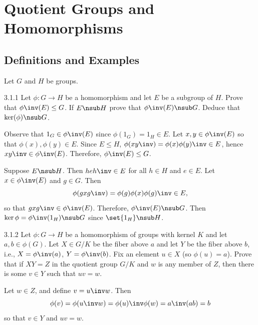 \section{Quotient Groups and Homomorphisms}

\subsection{Definitions and Examples}

Let $G$ and $H$ be groups.

\begin{exercise}{3.1.1}
    Let $\phi : G \to H$ be a homomorphism and let $E$ be a subgroup of $H$.
	Prove that $\phi\inv(E) \leq G$.
	If $E \nsub H$ prove that $\phi\inv(E) \nsub G$.
	Deduce that $\ker(\phi) \nsub G$.
\end{exercise}

\begin{sol}
    Observe that $1_G \in \phi\inv(E)$ since $\phi(1_G) = 1_H \in E$.
	Let $x, y \in \phi\inv(E)$ so that $\phi(x), \phi(y) \in E$.
	Since $E \leq H$, $\phi(xy\inv) = \phi(x)\phi(y)\inv \in E$, hence $xy\inv \in \phi\inv(E)$.
	Therefore, $\phi\inv(E) \leq G$.

    Suppose $E \nsub H$.
	Then $heh\inv \in E$ for all $h \in H$ and $e \in E$.
	Let $x \in \phi\inv(E)$ and $g \in G$.
	Then
    \[
    	\phi(gxg\inv) = \phi(g)\phi(x)\phi(g)\inv \in E,
    \]
    so that $gxg\inv \in \phi\inv(E)$.
	Therefore, $\phi\inv(E) \nsub G$.
	Then $\ker \phi = \phi\inv(1_H) \nsub G$ since $\set{1_H} \nsub H$.
\end{sol}

\begin{exercise}{3.1.2}
    Let $\phi : G \to H$ be a homomorphism of groups with kernel $K$ and let $a,b \in \phi(G)$.
	Let $X \in G/K$ be the fiber above $a$ and let $Y$ be the fiber above $b$, i.e., $X = \phi\inv (a)$, $Y = \phi\inv (b)$.
	Fix an element $u \in X$ (so $\phi(u)=a$).
	Prove that if $XY = Z$ in the quotient group $G/K$ and $w$ is any member of $Z$, then there is some $v \in Y$ such that $uv = w$.
    
\end{exercise}

\begin{sol}
    Let $w \in Z$, and define $v = u\inv w$.
	Then
    \[
    	\phi(v) = \phi(u\inv w) = \phi(u)\inv \phi(w) = a\inv (ab) = b
    \]
    so that $v \in Y$ and $uv = w$.
\end{sol}

